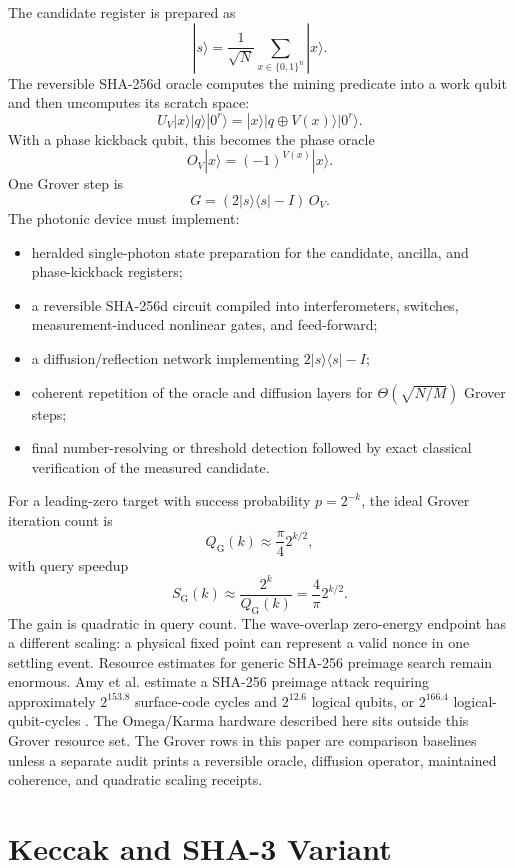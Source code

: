 \documentclass[11pt]{article}
\theoremstyle{definition}
\theoremstyle{remark}
\newcommand{\bits}{\{0,1\}}
\begin{document}
The candidate register is prepared as
\[
|s\rangle=\frac{1}{\sqrt N}\sum_{x\in\bits^n}|x\rangle.
\]
The reversible SHA-256d oracle computes the mining predicate into a work qubit
and then uncomputes its scratch space:
\[
U_V|x\rangle|q\rangle|0^r\rangle
=|x\rangle|q\oplus V(x)\rangle|0^r\rangle.
\]
With a phase kickback qubit, this becomes the phase oracle
\[
O_V|x\rangle=(-1)^{V(x)}|x\rangle.
\]
One Grover step is
\[
G=(2|s\rangle\langle s|-I)\,O_V.
\]
The photonic device must implement:

\begin{itemize}
\item heralded single-photon state preparation for the candidate, ancilla, and
phase-kickback registers;
\item a reversible SHA-256d circuit compiled into interferometers, switches,
measurement-induced nonlinear gates, and feed-forward;
\item a diffusion/reflection network implementing \(2|s\rangle\langle s|-I\);
\item coherent repetition of the oracle and diffusion layers for
\(\Theta(\sqrt{N/M})\) Grover steps;
\item final number-resolving or threshold detection followed by exact classical
verification of the measured candidate.
\end{itemize}

For a leading-zero target with success probability \(p=2^{-k}\), the ideal
Grover iteration count is
\[
Q_{\mathrm{G}}(k)\approx \frac{\pi}{4}2^{k/2},
\]
with query speedup
\[
S_{\mathrm{G}}(k)\approx \frac{2^k}{Q_{\mathrm{G}}(k)}
=\frac{4}{\pi}2^{k/2}.
\]
The gain is quadratic in query count. The wave-overlap zero-energy endpoint has
a different scaling: a physical fixed point can represent a valid nonce in one
settling event. Resource estimates for generic SHA-256
preimage search remain enormous. Amy et al. estimate a SHA-256 preimage attack
requiring approximately \(2^{153.8}\) surface-code cycles and \(2^{12.6}\)
logical qubits, or \(2^{166.4}\) logical-qubit-cycles \cite{AmyEtAl2016}.
The Omega/Karma hardware described here sits outside this Grover resource set.
The Grover rows in this paper are comparison baselines unless a separate audit
prints a reversible oracle, diffusion operator, maintained coherence, and
quadratic scaling receipts.

\FloatBarrier
\section{Keccak and SHA-3 Variant}
\end{document}
